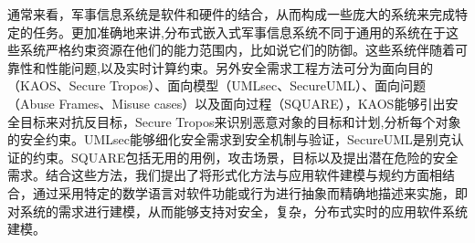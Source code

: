 \par
通常来看，军事信息系统是软件和硬件的结合，从而构成一些庞大的系统来完成特定的任务。更加准确地来讲,分布式嵌入式军事信息系统不同于通用的系统在于这些系统严格约束资源在他们的能力范围内，比如说它们的防御。这些系统伴随着可靠性和性能问题,以及实时计算约束。另外安全需求工程方法可分为面向目的（KAOS、Secure Tropos）、面向模型（UMLsec、SecureUML）、面向问题（Abuse Frames、Misuse cases）以及面向过程（SQUARE），KAOS能够引出安全目标来对抗反目标，Secure Tropos来识别恶意对象的目标和计划,分析每个对象的安全约束。UMLsec能够细化安全需求到安全机制与验证，SecureUML是别克认证的约束。SQUARE包括无用的用例，攻击场景，目标以及提出潜在危险的安全需求。结合这些方法，我们提出了将形式化方法与应用软件建模与规约方面相结合，通过采用特定的数学语言对软件功能或行为进行抽象而精确地描述来实施，即对系统的需求进行建模，从而能够支持对安全，复杂，分布式实时的应用软件系统建模。
